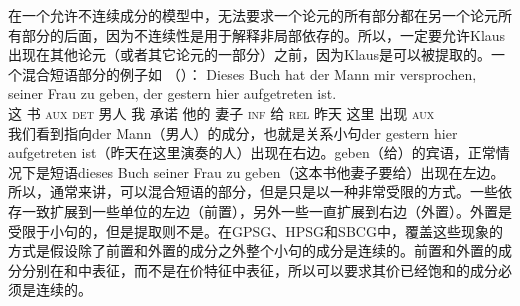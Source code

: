 在一个允许不连续成分的模型中，无法要求一个论元的所有部分都在另一个论元所有部分的后面，因为不连续性是用于解释非局部依存的。所以，一定要允许Klaus出现在其他论元（或者其它论元的一部分）之前，因为Klaus是可以被提取的。一个混合短语部分的例子如 （）：
\ea
\gll Dieses Buch hat der Mann mir versprochen, seiner Frau zu geben, der gestern hier aufgetreten ist.\\
     这   书 \textsc{aux} \textsc{det} 男人  我  承诺     他的    妻子 \textsc{inf} 给   \textsc{rel} 昨天 这里 出现 \textsc{aux}\\
\z 
我们看到指向der Mann（男人）的成分，也就是关系小句der gestern hier aufgetreten ist（昨天在这里演奏的人）出现在右边。geben（给）的宾语，正常情况下是短语dieses Buch seiner Frau zu geben（这本书他妻子要给）出现在左边。所以，通常来讲，可以混合短语的部分，但是只是以一种非常受限的方式。一些依存一致扩展到一些单位的左边（前置），另外一些一直扩展到右边（外置）。外置是受限于小句的，但是提取则不是。在GPSG、HPSG和SBCG中，覆盖这些现象的方式是假设除了前置和外置的成分之外整个小句的成分是连续的。前置和外置的成分分别在\slaschc 和\extrac\citep{Keller95b,Mueller99a}中表征，而不是在价特征中表征，所以可以要求其价已经饱和的成分必须是连续的。

